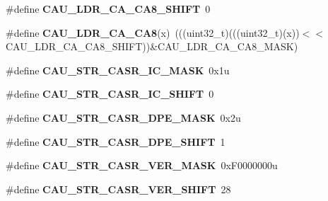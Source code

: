 \begin{DoxyCompactItemize}
\item 
\#define {\bfseries C\+A\+U\+\_\+\+L\+D\+R\+\_\+\+C\+A\+\_\+\+C\+A8\+\_\+\+S\+H\+I\+FT}~0\hypertarget{group__CAU__Register__Masks_ga41f527c7bdb6b4b5502baa4d4dc79cbc}{}\label{group__CAU__Register__Masks_ga41f527c7bdb6b4b5502baa4d4dc79cbc}

\item 
\#define {\bfseries C\+A\+U\+\_\+\+L\+D\+R\+\_\+\+C\+A\+\_\+\+C\+A8}(x)~(((uint32\+\_\+t)(((uint32\+\_\+t)(x))$<$$<$C\+A\+U\+\_\+\+L\+D\+R\+\_\+\+C\+A\+\_\+\+C\+A8\+\_\+\+S\+H\+I\+FT))\&C\+A\+U\+\_\+\+L\+D\+R\+\_\+\+C\+A\+\_\+\+C\+A8\+\_\+\+M\+A\+SK)\hypertarget{group__CAU__Register__Masks_ga2c7bb58b9c62ed37bc454b44f87e015c}{}\label{group__CAU__Register__Masks_ga2c7bb58b9c62ed37bc454b44f87e015c}

\item 
\#define {\bfseries C\+A\+U\+\_\+\+S\+T\+R\+\_\+\+C\+A\+S\+R\+\_\+\+I\+C\+\_\+\+M\+A\+SK}~0x1u\hypertarget{group__CAU__Register__Masks_ga8dffcd6d4b1c0445b861214d9fcb2bbd}{}\label{group__CAU__Register__Masks_ga8dffcd6d4b1c0445b861214d9fcb2bbd}

\item 
\#define {\bfseries C\+A\+U\+\_\+\+S\+T\+R\+\_\+\+C\+A\+S\+R\+\_\+\+I\+C\+\_\+\+S\+H\+I\+FT}~0\hypertarget{group__CAU__Register__Masks_ga6c5490b9ee06c378d9e52f5dcc4e4da6}{}\label{group__CAU__Register__Masks_ga6c5490b9ee06c378d9e52f5dcc4e4da6}

\item 
\#define {\bfseries C\+A\+U\+\_\+\+S\+T\+R\+\_\+\+C\+A\+S\+R\+\_\+\+D\+P\+E\+\_\+\+M\+A\+SK}~0x2u\hypertarget{group__CAU__Register__Masks_ga44bc22302cf006a4b12f130de2f509ab}{}\label{group__CAU__Register__Masks_ga44bc22302cf006a4b12f130de2f509ab}

\item 
\#define {\bfseries C\+A\+U\+\_\+\+S\+T\+R\+\_\+\+C\+A\+S\+R\+\_\+\+D\+P\+E\+\_\+\+S\+H\+I\+FT}~1\hypertarget{group__CAU__Register__Masks_gade64f9ddd7c12103c652b284f192d6ea}{}\label{group__CAU__Register__Masks_gade64f9ddd7c12103c652b284f192d6ea}

\item 
\#define {\bfseries C\+A\+U\+\_\+\+S\+T\+R\+\_\+\+C\+A\+S\+R\+\_\+\+V\+E\+R\+\_\+\+M\+A\+SK}~0x\+F0000000u\hypertarget{group__CAU__Register__Masks_ga5447564cf9ebe8e0ed52d5367304d0cd}{}\label{group__CAU__Register__Masks_ga5447564cf9ebe8e0ed52d5367304d0cd}

\item 
\#define {\bfseries C\+A\+U\+\_\+\+S\+T\+R\+\_\+\+C\+A\+S\+R\+\_\+\+V\+E\+R\+\_\+\+S\+H\+I\+FT}~28\hypertarget{group__CAU__Register__Masks_ga8103f4482a52d4ea2c47a26161596b66}{}\label{group__CAU__Register__Masks_ga8103f4482a52d4ea2c47a26161596b66}


\end{DoxyCompactItemize}
